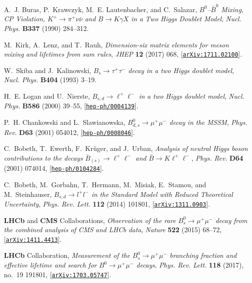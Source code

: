\documentclass[review]{elsarticle}
\begin{document}
\begin{thebibliography}{100}
A.~J. Buras, P.~Krawczyk, M.~E. Lautenbacher, and C.~Salazar, {\it
  {$B^0$--$\bar B^0$ Mixing, {CP} Violation, $K^+ \to \pi^+ \nu \bar{\nu}$ and
  $B \to K \gamma X$ in a Two Higgs Doublet Model}},  {\em Nucl. Phys.} {\bf
  B337} (1990) 284--312.

M.~Kirk, A.~Lenz, and T.~Rauh, {\it {Dimension-six matrix elements for meson
  mixing and lifetimes from sum rules}},  {\em JHEP} {\bf 12} (2017) 068,
  [\href{http://arxiv.org/abs/1711.02100}{{\tt arXiv:1711.02100}}].

W.~Skiba and J.~Kalinowski, {\it {$B_s \to \tau^{+} \tau^{-}$ decay in a two
  Higgs doublet model}},  {\em Nucl. Phys.} {\bf B404} (1993) 3--19.

H.~E. Logan and U.~Nierste, {\it {$B_{s,d} \to \ell^+ \ell^-$ in a two Higgs
  doublet model}},  {\em Nucl. Phys.} {\bf B586} (2000) 39--55,
  [\href{http://arxiv.org/abs/hep-ph/0004139}{{\tt hep-ph/0004139}}].

P.~H. Chankowski and L.~Slawianowska, {\it {$B^0_{d,s} \to \mu^+ \mu^-$ decay
  in the MSSM}},  {\em Phys. Rev.} {\bf D63} (2001) 054012,
  [\href{http://arxiv.org/abs/hep-ph/0008046}{{\tt hep-ph/0008046}}].

C.~Bobeth, T.~Ewerth, F.~Kr{\"u}ger, and J.~Urban, {\it {Analysis of neutral
  Higgs boson contributions to the decays $\bar{B}_{(s)} \to \ell^{+} \ell^{-}$
  and $\bar{B} \to K \ell^{+} \ell^{-}$}},  {\em Phys. Rev.} {\bf D64} (2001)
  074014, [\href{http://arxiv.org/abs/hep-ph/0104284}{{\tt hep-ph/0104284}}].

C.~Bobeth, M.~Gorbahn, T.~Hermann, M.~Misiak, E.~Stamou, and M.~Steinhauser,
  {\it {$B_{s,d} \to l^+ l^-$ in the Standard Model with Reduced Theoretical
  Uncertainty}},  {\em Phys. Rev. Lett.} {\bf 112} (2014) 101801,
  [\href{http://arxiv.org/abs/1311.0903}{{\tt arXiv:1311.0903}}].

{\bf LHCb} and {\bf CMS} Collaborations,  {\it {Observation of the
  rare $B^0_s\to\mu^+\mu^-$ decay from the combined analysis of CMS and LHCb
  data}},  {\em Nature} {\bf 522} (2015) 68--72,
  [\href{http://arxiv.org/abs/1411.4413}{{\tt arXiv:1411.4413}}].

{\bf LHCb} Collaboration,  {\it {Measurement of the
  $B^0_s\to\mu^+\mu^-$ branching fraction and effective lifetime and search for
  $B^0\to\mu^+\mu^-$ decays}},  {\em Phys. Rev. Lett.} {\bf 118} (2017), no.~19
  191801, [\href{http://arxiv.org/abs/1703.05747}{{\tt arXiv:1703.05747}}].


\end{thebibliography}
\end{document}
